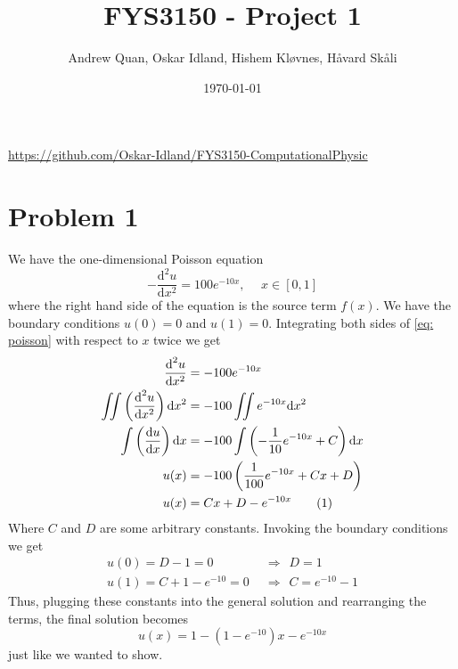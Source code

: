 \documentclass[english,notitlepage]{revtex4-1}  %
\newcommand{\imp}{\hspace{5pt}\Rightarrow\hspace{5pt}}
\newcommand\numberthis{\addtocounter{equation}{1}\tag{\theequation}}
\begin{document}
\title{\textbf{FYS3150 - Project 1}}
\author{Andrew Quan, Oskar Idland, Hishem Kløvnes, Håvard Skåli}
\date{\today}                             %
\noaffiliation      




\maketitle 
    
\href{https://github.com/Oskar-Idland/FYS3150-ComputationalPhysic}{https://github.com/Oskar-Idland/FYS3150-ComputationalPhysic}%
    
\section*{Problem 1}
We have the one-dimensional Poisson equation
\begin{equation}\label{eq: poisson}
    -\frac{\text{d}^2 u}{\text{d}x^2} = 100e^{-10x}, \hspace{15pt} x \in [0,1] 
\end{equation}
where the right hand side of the equation is the source term $f(x)$. We have the boundary conditions $u(0) = 0$ and $u(1) = 0$. Integrating both sides of \cref{eq: poisson} with respect to $x$ twice we get
\begin{align*}
    \frac{\text{d}^2 u}{\text{d}x^2} &= -100e^{-10x} \\
    \iint \left( \frac{\text{d}^2 u}{\text{d}x^2} \right) \text{d}x^2 &= -100\iint e^{-10x} \text{d}x^2 \\
    \int \left( \frac{\text{d}u}{\text{d}x}\right) \text{d}x &= -100\int \left(-\frac{1}{10}e^{-10x} + C\right)\text{d}x \\
    u(x) &= -100\left(\frac{1}{100}e^{-10x} + Cx + D\right) \\
    u(x) &= Cx + D - e^{-10x} \numberthis \label{general sol}
\end{align*}
Where $C$ and $D$ are some arbitrary constants. Invoking the boundary conditions we get
\begin{align*}
    u(0) = D - 1 = 0 &\imp D = 1 \\
    u(1) = C + 1 - e^{-10} = 0 &\imp C = e^{-10} - 1
\end{align*}
Thus, plugging these constants into the general solution and rearranging the terms, the final solution becomes
\begin{equation}
    u(x) = 1 - \left(1 - e^{-10}\right)x - e^{-10x} \label{final sol}
\end{equation}
just like we wanted to show.
\end{document}
